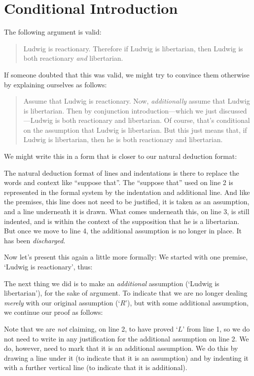 \section{Conditional Introduction}
The following argument is valid:
	\begin{quote}
		Ludwig is reactionary. Therefore if Ludwig is libertarian, then Ludwig is both reactionary \emph{and} libertarian.
	\end{quote}
If someone doubted that this was valid, we might try to convince them otherwise by explaining ourselves as follows:
	\begin{quote}
		Assume that Ludwig is reactionary. Now, \emph{additionally} assume that Ludwig is libertarian. Then by conjunction introduction---which we just discussed---Ludwig is both reactionary and libertarian. Of course, that's conditional on the assumption that Ludwig is libertarian. But this just means that, if Ludwig is libertarian, then he is both reactionary and libertarian.
	\end{quote}

We might write this in a form that is closer to our natural deduction format:
\begin{pf}
	\open
		\close
\end{pf}\medskip  
The natural deduction format of lines and indentations is there to replace the words and context like ``suppose that''. The ``suppose that'' used on line 2 is represented in the formal system by the indentation and additional line. And like the premises, this line does not need to be justified, it is taken as an assumption, and a line underneath it is drawn. What comes underneath this, on line 3, is still indented, and is within the context of the supposition that he is a libertarian. But once we move to line 4, the additional assumption is no longer in place. It has been \emph{discharged}.

Now let's present this again a little more formally: We started with one premise, `Ludwig is reactionary', thus:
	\begin{pf}
	\end{pf}
The next thing we did is to make an \emph{additional} assumption (`Ludwig is libertarian'), for the sake of argument. To indicate that we are no longer dealing \emph{merely} with our original assumption (`$R$'), but with some additional assumption, we continue our proof as follows:
	\begin{pf}
		\hypo{r}{R}
		\open
			\hypo{l}{L}
	\end{pf}
Note that we are \emph{not} claiming, on line 2, to have proved `$L$' from line 1, so we do not need to write in any justification for the additional assumption on line 2. We do, however, need to mark that it is an additional assumption. We do this by drawing a line under it (to indicate that it is an assumption) and by indenting it with a further vertical line (to indicate that it is additional). 

